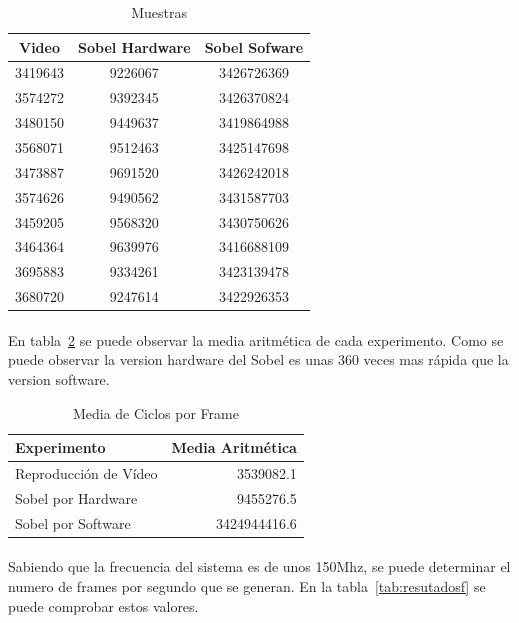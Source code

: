 \documentclass[a4paper,12pt,titlepage,final]{book}
\begin{document}
\begin{table}[hd]
\centering
\begin{tabular}{*{3}{c}}
Video   & Sobel Hardware & Sobel Sofware \\
\hline
3419643 &    9226067     &  3426726369   \\
3574272 &    9392345     &  3426370824   \\
3480150 &    9449637     &  3419864988   \\
3568071 &    9512463     &  3425147698   \\
3473887 &    9691520     &  3426242018   \\
3574626 &    9490562     &  3431587703   \\
3459205 &    9568320     &  3430750626   \\
3464364 &    9639976     &  3416688109   \\
3695883 &    9334261     &  3423139478   \\
3680720 &    9247614     &  3422926353   \\
\end{tabular}
\caption{Muestras}
\label{tab:Muestras}
\end{table}

\paragraph{}
En tabla~\ref{tab:resutadosc} se puede observar la media aritmética de cada experimento. Como se puede observar la version hardware del Sobel es unas 360 veces mas rápida que la version software.

\begin{table}[hd]
\centering
\begin{tabular}{l r}
Experimento            & Media Aritmética \\
\hline
Reproducción de Vídeo  &    3539082.1     \\
Sobel por Hardware     &    9455276.5     \\
Sobel por Software     &   3424944416.6   \\
\end{tabular}
\caption{Media de Ciclos por Frame}
\label{tab:resutadosc}
\end{table}

\paragraph{}
Sabiendo que la frecuencia del sistema es de unos 150Mhz, se puede determinar el numero de frames por segundo que se generan. En la tabla~\ref{tab:resutadosf} se puede comprobar estos valores.
\end{document}
